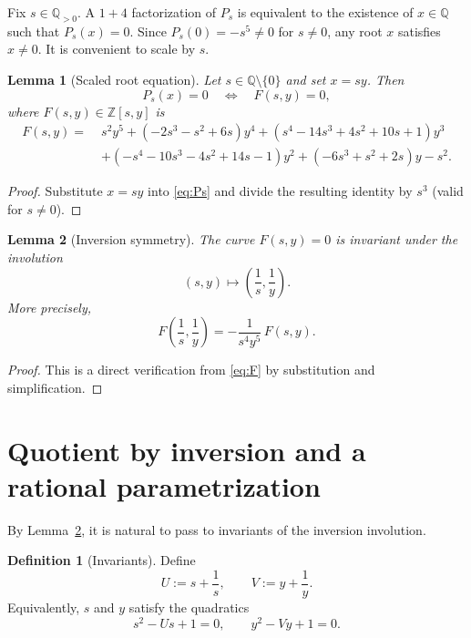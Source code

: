 \documentclass[12pt]{article}
\newtheorem{lemma}{Lemma}
\theoremstyle{remark}
\theoremstyle{definition}
\newtheorem{definition}{Definition}
\begin{document}
Fix $s\in\mathbb{Q}_{>0}$.
A $1+4$ factorization of $P_s$ is equivalent to the existence of $x\in\mathbb{Q}$ such that $P_s(x)=0$.
Since $P_s(0)=-s^5\neq 0$ for $s\neq 0$, any root $x$ satisfies $x\neq 0$.
It is convenient to scale by $s$.

\begin{lemma}[Scaled root equation]\label{lem:F}
Let $s\in\mathbb{Q}\setminus\{0\}$ and set $x=s y$.
Then
\[
P_s(x)=0\quad\Longleftrightarrow\quad F(s,y)=0,
\]
where $F(s,y)\in\mathbb{Z}[s,y]$ is
\begin{equation}\label{eq:F}
\begin{aligned}
F(s,y)=\;& s^{2}y^{5} + (-2s^{3}-s^{2}+6s)y^{4} + (s^{4}-14s^{3}+4s^{2}+10s+1)y^{3}\\
&+(-s^{4}-10s^{3}-4s^{2}+14s-1)y^{2} + (-6s^{3}+s^{2}+2s)y - s^{2}.
\end{aligned}
\end{equation}
\end{lemma}

\begin{proof}
Substitute $x=sy$ into \eqref{eq:Ps} and divide the resulting identity by $s^3$ (valid for $s\neq 0$).
\end{proof}

\begin{lemma}[Inversion symmetry]\label{lem:inv}
The curve $F(s,y)=0$ is invariant under the involution
\[
(s,y)\longmapsto\left(\frac1s,\frac1y\right).
\]
More precisely,
\begin{equation}\label{eq:inv}
F\!\left(\frac1s,\frac1y\right)=-\frac{1}{s^{4}y^{5}}\,F(s,y).
\end{equation}
\end{lemma}

\begin{proof}
This is a direct verification from \eqref{eq:F} by substitution and simplification.
\end{proof}


\section{Quotient by inversion and a rational parametrization}\label{sec:quotient}

By Lemma~\ref{lem:inv}, it is natural to pass to invariants of the inversion involution.

\begin{definition}[Invariants]\label{def:UV}
Define
\[
U:=s+\frac1s,\qquad V:=y+\frac1y.
\]
Equivalently, $s$ and $y$ satisfy the quadratics
\begin{equation}\label{eq:quadUV}
s^{2}-Us+1=0,\qquad y^{2}-Vy+1=0.
\end{equation}
\end{definition}
\end{document}
